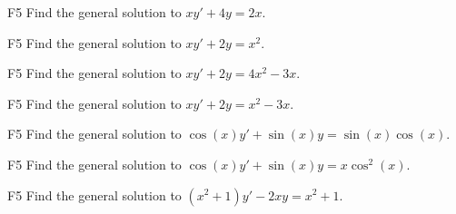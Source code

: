\begin{problem}{F5}
Find the general solution to \(xy' + 4y = 2x\).
\end{problem}

\begin{problem}{F5}
Find the general solution to \(xy' + 2y = x^2\).
\end{problem}

\begin{problem}{F5}
Find the general solution to \(xy' + 2y = 4x^2-3x\).
\end{problem}

\begin{problem}{F5}
Find the general solution to \(xy' + 2y = x^2-3x\).
\end{problem}

\begin{problem}{F5}
Find the general solution to \(\cos(x) y' + \sin (x)y = \sin(x)\cos(x) \).
\end{problem}

\begin{problem}{F5}
Find the general solution to \(\cos(x) y' + \sin (x)y = x \cos^2(x) \).
\end{problem}


\begin{problem}{F5}
Find the general solution to \((x^2+1)y' - 2xy =x^2+1 \).
\end{problem}
